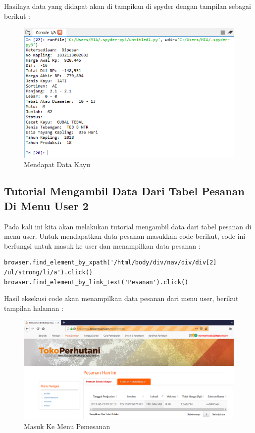Hasilnya data yang didapat akan di tampikan di spyder dengan tampilan sebagai berikut :
\begin{figure}[h]
	\centering
	\includegraphics[scale=0.6]{figures/mendapatdatakayu}
	\caption{Mendapat Data Kayu}
\end{figure}

\subsection{Tutorial Mengambil Data Dari Tabel Pesanan Di Menu User 2}
Pada kali ini kita akan melakukan tutorial mengambil data dari tabel pesanan di menu user. Untuk mendapatkan data pesanan masukkan code berikut, code ini berfungsi untuk masuk ke user dan menampilkan data pesanan :
\begin{verbatim}
browser.find_element_by_xpath('/html/body/div/nav/div/div[2]
/ul/strong/li/a').click()
browser.find_element_by_link_text('Pesanan').click()
\end{verbatim}


Hasil eksekusi code akan menampilkan data pesanan dari menu user, berikut tampilan halaman :
\begin{figure}[h]
	\centering
	\includegraphics[scale=0.3]{figures/datapesanan}
	\caption{Masuk Ke Menu Pemesanan}
\end{figure}

